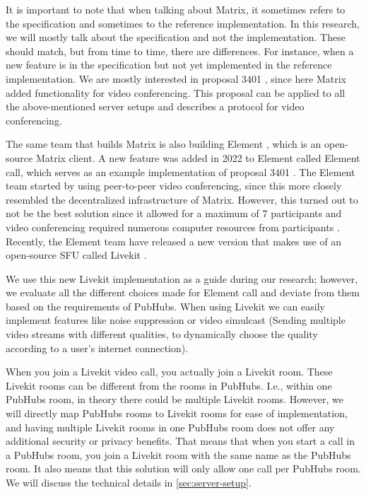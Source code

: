 \documentclass{report}
\begin{document}
It is important to note that when talking about Matrix, it sometimes refers to the specification and sometimes to the
reference implementation. In this research, we will mostly talk about the specification and not the implementation. These
should match, but from time to time, there are differences. For instance, when a new feature is in the specification
but not yet implemented in the reference implementation. We are mostly interested in proposal 3401 \cite{
noauthor_matrix-spec-proposalsproposals3401-group-voipmd_nodate}, since here Matrix added functionality for video conferencing.
This proposal can be applied to all the above-mentioned server setups and describes a protocol for video conferencing.

The same team that builds Matrix is also building Element \cite{noauthor_element_nodate}, which is an open-source Matrix client.
A new feature was added in 2022 \cite{noauthor_introducing_2022} to Element called Element call, which serves as an
example implementation of proposal 3401 \cite{noauthor_matrix-spec-proposalsproposals3401-group-voipmd_nodate}.
The Element team started by using peer-to-peer video conferencing, since this more closely resembled the decentralized
infrastructure of Matrix. However, this turned out to not be the best solution since it allowed for a maximum of 7
participants and video conferencing required numerous computer resources from participants \cite{heese_lab3_nodate}.
Recently, the Element team have released a new version that makes use of an open-source SFU called Livekit
\cite{noauthor_livekit_nodate}.

We use this new Livekit implementation as a guide during our research; however, we evaluate all the different
choices made for Element call and deviate from them based on the requirements of PubHubs. When using Livekit we can
easily implement features like noise suppression or video simulcast (Sending multiple video streams with different
qualities, to dynamically choose the quality according to a user's internet connection).

When you join a Livekit video call, you actually join a Livekit room. These Livekit rooms can be different from the
rooms in PubHubs. I.e., within one PubHubs room, in theory there could be multiple Livekit rooms. However, we will
directly map PubHubs rooms to Livekit rooms for ease of implementation, and having multiple Livekit rooms in one
PubHubs room does not offer any additional security or privacy benefits. That means that when you start a
call in a PubHubs room, you join a Livekit room with the same name as the PubHubs room. It also means that this solution
will only allow one call per PubHubs room. We will discuss the technical details in \autoref{sec:server-setup}.
\end{document}
